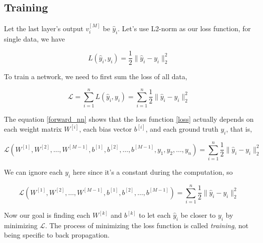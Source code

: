 \documentclass[../main.tex]{subfiles}
\begin{document}
        \subsection{Training}

            Let the last layer's output $v_i^{ [M] }$ be $\hat{y}_{i}$. Let's
            use L2-norm as our loss function, for single data, we have

            \begin{equation}\label{loss}
                L(\hat{y}_i, y_i) = \frac{1}{2} \| \hat{y}_i - y_i \|_2^2
            \end{equation}

            To train a network, we need to first sum the loss of all data,

            \begin{equation*}
                \mathcal{L} = \sum_{i=1}^n L(\hat{y}_{i}, y_{i}) =
                \sum_{i=1}^n \frac{1}{2} \| \hat{y}_{i} - y_i \|_2^2
            \end{equation*}

            The equation \ref{forward_nn} shows that the loss function
            \ref{loss} actually depends on each weight matrix $W^{[i]}$, each
            bias vector $b^{ [i] }$, and each ground truth $y_{i}$, that is,

            \begin{equation*}
                \mathcal{L}(W^{ [1] }, W^{ [2] }, \dots, W^{ [M-1] }, b^{ [1] },b^{ [2] },
                \dots, b^{ [M-1] }, y_{1}, y_{2}, \dots, y_n) = \sum_{i=1}^n \frac{1}{2} \| \hat{y}_{i} - y_i \|_2^2
            \end{equation*}

            We can ignore each $y_{i}$ here since it's a constant during the computation, so

            \begin{equation*}
                \mathcal{L}(W^{ [1] }, W^{ [2] }, \dots, W^{ [M-1] }, b^{ [1] },b^{ [2] },
                \dots, b^{ [M-1] }) = \sum_{i=1}^n \frac{1}{2} \| \hat{y}_{i} - y_i \|_2^2
            \end{equation*}
            
            Now our goal is finding each  $W^{ [k] }$ and $b^{ [k] }$ to let
            each $\hat{y}_{i}$ be closer to $y_{i}$ by minimizing
            $\mathcal{L}$. The process of minimizing the loss function is
            called \textit{training}, not being specific to back propagation.
\end{document}
